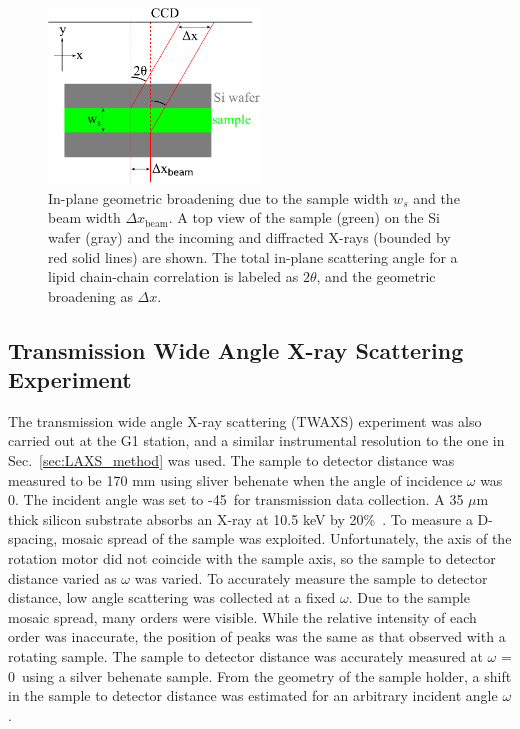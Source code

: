 \begin{figure}[htbp]
  \centering
  \includegraphics[width=0.5\textwidth]{figures/ripple/MMs/waxs/geometric_broadening}
  \caption{In-plane geometric broadening due to the sample width $w_s$ and the beam width $\Delta x_\textrm{beam}$.
  A top view of the sample (green) on the Si wafer (gray) and the
  incoming and diffracted X-rays (bounded by red solid lines)
  are shown. The total in-plane scattering
  angle for a lipid chain-chain correlation is labeled as $2\theta$, and 
  the geometric broadening as $\Delta x$.}
  \label{fig:geometric_broadening}
\end{figure}

\subsection{Transmission Wide Angle X-ray Scattering Experiment}
\label{TWAXS_method}
The transmission wide angle X-ray scattering (TWAXS) experiment was also 
carried out at the G1 station, and a similar instrumental resolution
to the one in Sec.~\ref{sec:LAXS_method} was used.
The sample to detector distance was measured to be 170 mm using sliver behenate 
when the angle of incidence $\omega$ was 0\textdegree.
The incident angle was set to -45\textdegree\ for transmission data
collection. A 35 $\mu$m thick silicon substrate absorbs an X-ray at
10.5 keV by 20\%\ \cite{ref:cxro}. 
To measure a D-spacing, mosaic spread of the sample was exploited. 
Unfortunately,
the axis of the rotation motor did not coincide with the sample axis, so
the sample to detector distance varied as $\omega$ was varied. To accurately
measure the sample to detector distance, low angle scattering was collected
at a fixed $\omega$. Due to the sample mosaic spread, many orders were
visible. While the relative intensity of each order was inaccurate, 
the position of peaks was the same as that observed with a rotating sample.
The sample to detector distance was accurately measured at $\omega$ = 0\textdegree\
using a silver behenate sample. From the geometry of the sample holder,
a shift in the sample to detector distance was estimated for an arbitrary 
incident angle $\omega$.

